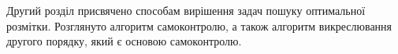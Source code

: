 Другий розділ присвячено способам вирішення задач пошуку оптимальної розмітки.
Розглянуто алгоритм самоконтролю, а також алгоритм викреслювання другого порядку, який є
основою самоконтролю.